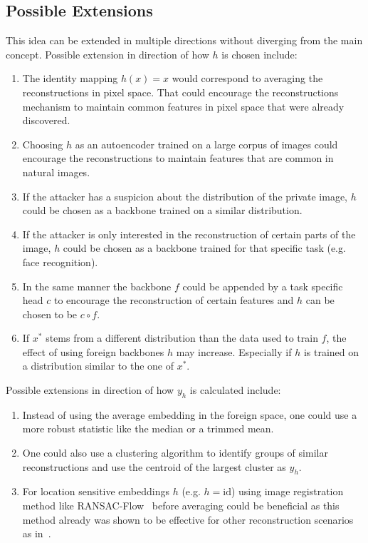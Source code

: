 \documentclass[10pt,twocolumn]{article}
\begin{document}
\subsection{Possible Extensions}
This idea can be extended in multiple directions without diverging from the main concept.
Possible extension in direction of how $h$ is chosen include:
\begin{enumerate}
    \item The identity mapping $h(x) = x$ would correspond to averaging the reconstructions in pixel space.
    That could encourage the reconstructions mechanism to maintain common features in pixel space that were already discovered.
    \item Choosing $h$ as an autoencoder trained on a large corpus of images could encourage the reconstructions to maintain features that are common in natural images.
    \item If the attacker has a suspicion about the distribution of the private image, $h$ could be chosen as a backbone trained on a similar distribution.
    \item If the attacker is only interested in the reconstruction of certain parts of the image, $h$ could be chosen as a backbone trained for that specific task (e.g. face recognition).
    \item In the same manner the backbone $f$ could be appended by a task specific head $c$ to encourage the reconstruction of certain features and $h$ can be chosen to be $c \circ f$.
    \item If $x^*$ stems from a different distribution than the data used to train $f$, the effect of using foreign backbones $h$ may increase.
    Especially if $h$ is trained on a distribution similar to the one of $x^*$.
\end{enumerate}
Possible extensions in direction of how $y_h$ is calculated include:
\begin{enumerate}
    \item Instead of using the average embedding in the foreign space, one could use a more robust statistic like the median or a trimmed mean.
    \item One could also use a clustering algorithm to identify groups of similar reconstructions and use the centroid of the largest cluster as $y_h$.
    \item For location sensitive embeddings $h$ (e.g. $h=\text{id}$) using image registration method like RANSAC-Flow~\cite{shenRANSACFlowGenericTwoStage2020} before averaging could be beneficial as this method already was shown to be effective for other reconstruction scenarios as in~\cite{yinSeeGradientsImage2021}.
\end{enumerate}
\end{document}
